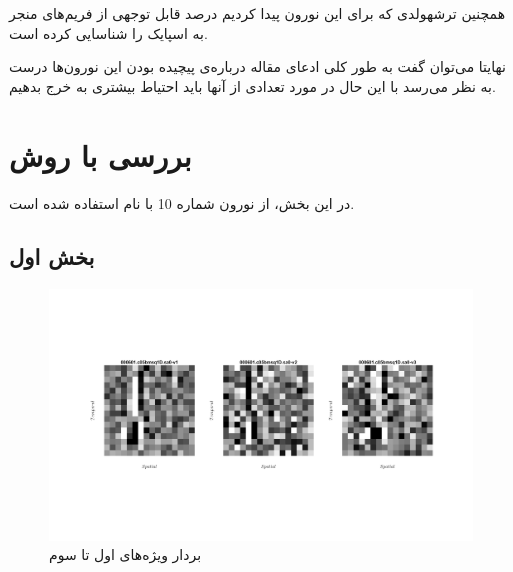 \documentclass[12pt,onecolumn,a4paper,fleqn]{article}
\begin{document}
 \begin{figure}[ht]
	\centering
	\hfill
\end{figure}

همچنین ترشهولدی که برای این نورون‌ پیدا کردیم درصد قابل توجهی از فریم‌های منجر به اسپایک را شناسایی کرده است.

نهایتا می‌توان گفت به طور کلی ادعای مقاله درباره‌ی پیچیده بودن این نورون‌ها درست به نظر می‌رسد با این حال در مورد تعدادی از آنها باید احتیاط بیشتری به خرج بدهیم.


\pagebreak

\section{ بررسی با روش }

در این بخش، از نورون شماره 10 با نام 
استفاده شده است.

\subsection{بخش اول}

\begin{figure}[ht]
	\centering
	\includegraphics[trim = 5cm 10cm 5cm 10cm, clip= true, width=0.6\linewidth]{photos/4_1.png}
	\caption{بردار ویژه‌های اول تا سوم}
\end{figure}
\end{document}
